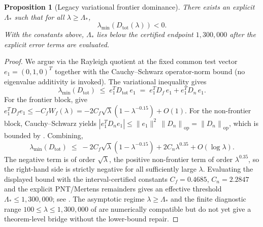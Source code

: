 \documentclass[11pt,a4paper]{article}
\newtheorem{proposition}[proposition]{Proposition}
\theoremstyle{remark}
\theoremstyle{plain}
\newcommand{\norm}[1]{\left\lVert #1 \right\rVert}
\begin{document}
\begin{proposition}[Legacy variational frontier dominance]
\label{prop:frontier-dominance}
There exists an explicit $\Lambda_*$ such that for all $\lambda\geq\Lambda_*$,
\[
  \lambda_{\min}(D_{\mathrm{tot}}(\lambda))<0.
\]
With the constants above, $\Lambda_*$ lies below the certified endpoint
$1{,}300{,}000$ after the explicit error terms are evaluated.
\end{proposition}

\begin{proof}
We argue via the Rayleigh quotient at the fixed common test vector $e_1=(0,1,0)^T$
together with the Cauchy--Schwarz operator-norm bound (no eigenvalue additivity
is invoked). The variational inequality gives
\[
  \lambda_{\min}(D_{\mathrm{tot}})
  \;\leq\;
  e_1^T D_{\mathrm{tot}}\, e_1
  \;=\;
  e_1^T D_f\, e_1 + e_1^T D_n\, e_1.
\]
For the frontier block,  give
$e_1^T D_f e_1 \leq -C_f W_f(\lambda) = -2C_f\sqrt\lambda(1-\lambda^{-0.15})+O(1)$.
For the non-frontier block, Cauchy--Schwarz yields
$|e_1^T D_n e_1| \leq \|e_1\|^2\,\norm{D_n}_{\mathrm{op}} = \norm{D_n}_{\mathrm{op}}$,
which is bounded by . Combining,
\[
  \lambda_{\min}(D_{\mathrm{tot}})
  \;\leq\;
  -2C_f\sqrt\lambda(1-\lambda^{-0.15})
  + 2C_n\lambda^{0.35}
  + O(\log\lambda).
\]
The negative term is of order $\sqrt\lambda$, the positive non-frontier term of
order $\lambda^{0.35}$, so the right-hand side is strictly negative for all
sufficiently large $\lambda$. Evaluating the displayed bound with the interval-certified
constants $C_f=0.4685$, $C_n=2.2847$ and the explicit PNT/Mertens remainders
gives an effective threshold $\Lambda_*\leq 1{,}300{,}000$; see
\cite[Proposition~A6 (Direct Frontier-Dominance), Remark on direct-proof
ingredients]{GeigerLandscapeII}. The asymptotic regime $\lambda\geq\Lambda_*$ and
the finite diagnostic range $100\leq\lambda\leq 1{,}300{,}000$ of
 are numerically compatible but do not yet give
a theorem-level bridge without the lower-bound repair.
\end{proof}
\end{document}
